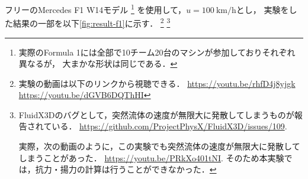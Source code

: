 フリーのMercedes F1 W14モデル
\footnote{
    実際のFormula 1には全部で10チーム20台のマシンが参加しておりそれぞれ異なるが，
    大まかな形状は同じである．
}
を使用して，$u=\SI{100}{\kilo\meter\per\hour}$とし，
実験をした結果の一部を以下\ref{fig:result-f1}に示す．
\footnote{
    実験の動画は以下のリンクから視聴できる．
    \url{https://youtu.be/rhfD4j8yjgk}
    \url{https://youtu.be/dGVB6DQThHI}
}
\footnote{
    FluidX3Dのバグとして，突然流体の速度が無限大に発散してしまうものが報告されている．
    \url{https://github.com/ProjectPhysX/FluidX3D/issues/109}.

    実際，次の動画のように，この実験でも突然流体の速度が無限大に発散してしまうことがあった．
    \url{https://youtu.be/PRkXo401tNI}.
    そのため本実験では，抗力・揚力の計算は行うことができなかった．

}



